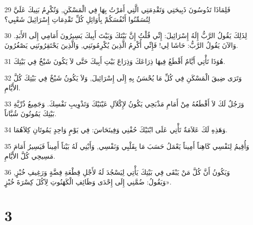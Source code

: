 \par 29 فَلِمَاذَا تَدُوسُونَ ذَبِيحَتِي وَتَقْدِمَتِي الَّتِي أَمَرْتُ بِهَا فِي الْمَسْكَنِ, وَتُكْرِمُ بَنِيكَ عَلَيَّ لِتُسَمِّنُوا أَنْفُسَكُمْ بِأَوَائِلِ كُلِّ تَقْدِمَاتِ إِسْرَائِيلَ شَعْبِي؟
\par 30 لِذَلِكَ يَقُولُ الرَّبُّ إِلَهُ إِسْرَائِيلَ: إِنِّي قُلْتُ إِنَّ بَيْتَكَ وَبَيْتَ أَبِيكَ يَسِيرُونَ أَمَامِي إِلَى الأَبَدِ. وَالآنَ يَقُولُ الرَّبُّ: حَاشَا لِي! فَإِنِّي أُكْرِمُ الَّذِينَ يُكْرِمُونَنِي, وَالَّذِينَ يَحْتَقِرُونَنِي يَصْغُرُونَ.
\par 31 هُوَذَا تَأْتِي أَيَّامٌ أَقْطَعُ فِيهَا ذِرَاعَكَ وَذِرَاعَ بَيْتِ أَبِيكَ حَتَّى لاَ يَكُونَ شَيْخٌ فِي بَيْتِكَ.
\par 32 وَتَرَى ضِيقَ الْمَسْكَنِ فِي كُلِّ مَا يُحْسَنُ بِهِ إِلَى إِسْرَائِيلَ, وَلاَ يَكُونُ شَيْخٌ فِي بَيْتِكَ كُلَّ الأَيَّامِ.
\par 33 وَرَجُلٌ لَكَ لاَ أَقْطَعُهُ مِنْ أَمَامِ مَذْبَحِي يَكُونُ لإِكْلاَلِ عَيْنَيْكَ وَتَذْوِيبِ نَفْسِكَ. وَجَمِيعُ ذُرِّيَّةِ بَيْتِكَ يَمُوتُونَ شُبَّاناً.
\par 34 وَهَذِهِ لَكَ عَلاَمَةٌ تَأْتِي عَلَى ابْنَيْكَ حُفْنِي وَفِينَحَاسَ: فِي يَوْمٍ وَاحِدٍ يَمُوتَانِ كِلاَهُمَا.
\par 35 وَأُقِيمُ لِنَفْسِي كَاهِناً أَمِيناً يَعْمَلُ حَسَبَ مَا بِقَلْبِي وَنَفْسِي, وَأَبْنِي لَهُ بَيْتاً أَمِيناً فَيَسِيرُ أَمَامَ مَسِيحِي كُلَّ الأَيَّامِ.
\par 36 وَيَكُونُ أَنَّ كُلَّ مَنْ يَبْقَى فِي بَيْتِكَ يَأْتِي لِيَسْجُدَ لَهُ لأَجْلِ قِطْعَةِ فِضَّةٍ وَرَغِيفِ خُبْزٍ, وَيَقُولُ: ضُمَّنِي إِلَى إِحْدَى وَظَائِفِ الْكَهَنُوتِ لِآكُلَ كِسْرَةَ خُبْزٍ».

\chapter{3}

